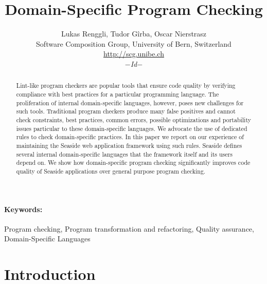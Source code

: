 \documentclass[10pt,twocolumn]{article}
\newcommand{\Title}{Domain-Specific Program Checking}
\newcommand{\Authors}{Lukas Renggli, Tudor G\^irba, Oscar Nierstrasz}
\newcommand{\version}{\emph{\scriptsize$-$Id$-$}}}
\newcommand{\version}{}}
\newcommand{\Seaside}{Seaside\xspace}
\begin{document}
\title{\Title}
\author{\Authors\vspace{1ex}\\
	Software Composition Group, University of Bern, Switzerland\\
	\url{http://scg.unibe.ch}\\
	\version}
\maketitle
\thispagestyle{empty}


\begin{abstract}
	Lint-like program checkers are popular tools that ensure code quality by verifying compliance with best practices for a particular programming language. The proliferation of internal domain-specific languages, however, poses new challenges for such tools. Traditional program checkers produce many false positives and cannot check constraints, best practices, common errors, possible optimizations and portability issues particular to these domain-specific languages. We advocate the use of dedicated rules to check domain-specific practices. In this paper we report on our experience of maintaining the \Seaside web application framework using such rules. \Seaside defines several internal domain-specific languages that the framework itself and its users depend on. We show how domain-specific program checking significantly improves code quality of \Seaside applications over general purpose program checking.
\end{abstract}

\vspace{-1cm}

\paragraph{Keywords:} Program checking, Program transformation and refactoring, Quality assurance, Domain-Specific Languages

\vspace{1cm}

\section{Introduction}\label{sec:introduction}
\end{document}
